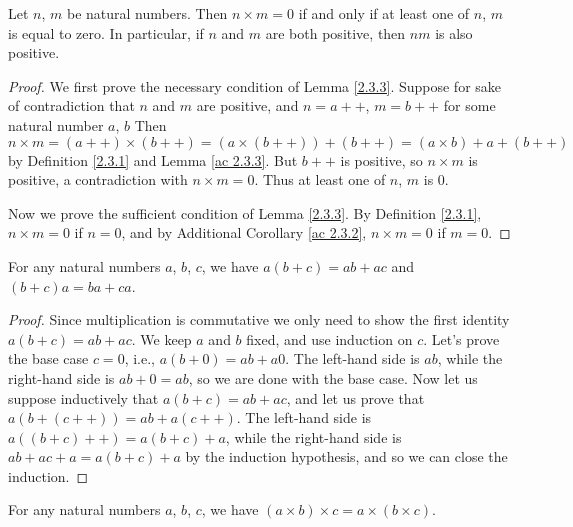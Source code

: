 \begin{lemma}\label{2.3.3}
Let \(n\), \(m\) be natural numbers.
Then \(n \times m = 0\) if and only if at least one of \(n\), \(m\) is equal to zero.
In particular, if \(n\) and \(m\) are both positive, then \(nm\) is also positive.
\end{lemma}

\begin{proof}
We first prove the necessary condition of Lemma \ref{2.3.3}.
Suppose for sake of contradiction that \(n\) and \(m\) are positive, and \(n = a++\), \(m = b++\) for some natural number \(a\), \(b\)
Then \(n \times m = (a++) \times (b++) = (a \times (b++)) + (b++) = (a \times b) + a + (b++)\) by Definition \ref{2.3.1} and Lemma \ref{ac 2.3.3}.
But \(b++\) is positive, so \(n \times m\) is positive, a contradiction with \(n \times m = 0\).
Thus at least one of \(n\), \(m\) is \(0\).

Now we prove the sufficient condition of Lemma \ref{2.3.3}.
By Definition \ref{2.3.1}, \(n \times m = 0\) if \(n = 0\), and by Additional Corollary \ref{ac 2.3.2}, \(n \times m = 0\) if \(m = 0\).
\end{proof}

\begin{proposition}\label{2.3.4}
For any natural numbers \(a\), \(b\), \(c\), we have \(a(b + c) = ab + ac\) and \((b + c)a = ba + ca\).
\end{proposition}

\begin{proof}
Since multiplication is commutative we only need to show the first identity \(a(b + c) = ab + ac\).
We keep \(a\) and \(b\) fixed, and use induction on \(c\).
Let’s prove the base case \(c = 0\), i.e., \(a(b + 0) = ab + a0\).
The left-hand side is \(ab\), while the right-hand side is \(ab + 0 = ab\), so we are done with the base case.
Now let us suppose inductively that \(a(b + c) = ab + ac\), and let us prove that \(a(b + (c++)) = ab + a(c++)\).
The left-hand side is \(a((b + c)++) = a(b + c) + a\), while the right-hand side is \(ab + ac + a = a(b + c) + a\) by the induction hypothesis, and so we can close the induction.
\end{proof}

\begin{proposition}\label{2.3.5}
For any natural numbers \(a\), \(b\), \(c\), we have \((a \times b) \times c = a \times (b \times c)\).
\end{proposition}

